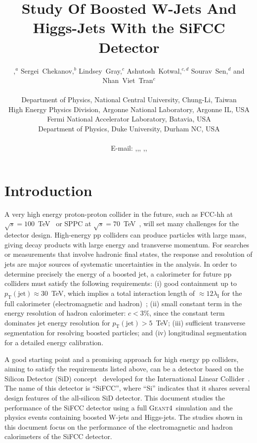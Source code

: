 \documentclass{PoS}
\title{Study Of Boosted W-Jets And Higgs-Jets With the SiFCC Detector}
\author{\speaker{Shin-Shan~Yu},$^{a}$ Sergei~Chekanov,$^{b}$ Lindsey~Gray,$^{c}$ Ashutosh~Kotwal,$^{c,d}$ Sourav~Sen,$^{d}$ and Nhan~Viet~Tran$^{c}$\\ \\
        \llap{$^a$}Department of Physics, National Central University, Chung-Li, Taiwan\\
        \llap{$^b$}High Energy Physics Division, Argonne National Laboratory, Argonne IL, USA\\
        \llap{$^c$}Fermi National Accelerator Laboratory, Batavia, USA\\
        \llap{$^d$}Department of Physics, Duke University, Durham NC, USA\\\\
        E-mail: \email{syu@cern.ch},\email{chekanov@anl.gov},\email{lagray@fnal.gov},
        \email{kotwal@phy.duke.edu},\email{ss567@phy.duke.edu},\email{ntran@fnal.gov}}
\newcommand{\ptj}{\ensuremath{p_{\mathrm{T}}(\mathrm{jet})}}
\newcommand{\GEANTfour} {{\textsc{Geant4}}}
\begin{document}
\section{Introduction}
A very high energy proton-proton collider in the future, such as FCC-hh 
at $\sqrt{s}=100$~TeV~\cite{FCC-hh} or 
SPPC at $\sqrt{s}=70$~TeV~\cite{SPPC-one,SPPC-three}, 
will set many challenges for the detector design. High-energy pp colliders 
can produce particles with large mass, giving decay products with large energy 
and transverse momentum. For searches or measurements that involve hadronic 
final states, the response and resolution of jets are major sources of 
systematic uncertainties in the analysis. 
In order to determine precisely the energy of a 
boosted jet, a calorimeter for future pp colliders must satisfy the following 
requirements: (i)
 good containment up to $\ptj\approx 30$~TeV, which implies a total 
 interaction length of $\approx 12 \lambda_\mathrm{I}$ for the full 
 calorimeter (electromagnetic and hadron)~\cite{bitch};
 (ii) small constant term in the energy resolution of hadron calorimeter: 
$c < 3\%$, since the constant term dominates jet energy resolution for 
$\ptj>5$~TeV;
 (iii) sufficient transverse segmentation for resolving boosted particles;
 and (iv) longitudinal segmentation for a detailed energy calibration.

A good starting point and a promising approach for high energy pp colliders, 
aiming to satisfy the requirements listed above, 
can be a detector based on the Silicon Detector (SiD) concept~\cite{sid} 
developed for the International Linear Collider~\cite{ILCone,ILCtwo}. The 
name of this detector is ``SiFCC'', where ``Si'' indicates that it 
shares several design features of the all-silicon SiD detector. 
%
This document studies the performance of the SiFCC detector using 
a full \GEANTfour\ simulation and the physics events containing 
boosted W-jets and Higgs-jets. The studies shown in this document 
focus on the performance of the electromagnetic and hadron calorimeters
 of the SiFCC detector.
\end{document}
